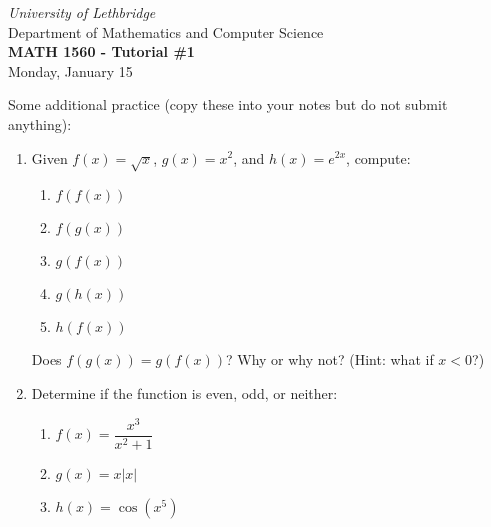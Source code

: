 \documentclass[12pt]{article}
\newcommand{\skipline}{\vspace{12pt}}
\newcommand{\abs}[1]{\lvert #1\rvert}
\begin{document}
\author{Instructor: Sean Fitzpatrick}
\thispagestyle{empty}
\begin{center}
\emph{University of Lethbridge}\\
Department of Mathematics and Computer Science\\
{\bf MATH 1560 - Tutorial \#1}\\
Monday, January 15
\end{center}
\skipline \skipline \skipline \noindent \skipline

\vspace*{\fill}



Some additional practice (copy these into your notes but do not submit anything):
\begin{enumerate}
\item Given $f(x)=\sqrt{x}$, $g(x)=x^2$, and $h(x)=e^{2x}$, compute:
\begin{multicols}{5}
\begin{enumerate}
\item $f(f(x))$
\item $f(g(x))$
\item $g(f(x))$
\item $g(h(x))$
\item $h(f(x))$
\end{enumerate}
\end{multicols}
Does $f(g(x))=g(f(x))$? Why or why not? (Hint: what if $x<0$?)
\item Determine if the function is even, odd, or neither:
\begin{multicols}{3}
\begin{enumerate}
\item $f(x) = \dfrac{x^3}{x^2+1}$
\item $g(x) = x\abs{x}$
\item $h(x) = \cos(x^5)$
\end{enumerate}
\end{multicols}
\end{enumerate}




\newpage
\end{document}
